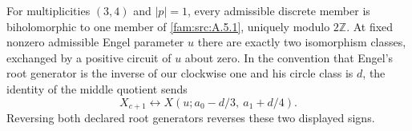 \begin{proposition}\hypertarget{tag-01QC}{}\label{fam:src:B.2.2}\label{fam:st:B.2.2}

For multiplicities $(3,4)$ and $|p|=1$, every admissible discrete member is biholomorphic to one member of \ref{fam:src:A.5.1}, uniquely modulo $2\mathbb Z$. At fixed nonzero admissible Engel parameter $u$ there are exactly two isomorphism classes, exchanged by a positive circuit of $u$ about zero. In the convention that Engel's root generator is the inverse of our clockwise one and his circle class is $d$, the identity of the middle quotient sends
\[
 X_{c+1}\longleftrightarrow X(u;a_0-d/3,\ a_1+d/4).
\]
Reversing both declared root generators reverses these two displayed signs.
\end{proposition}


